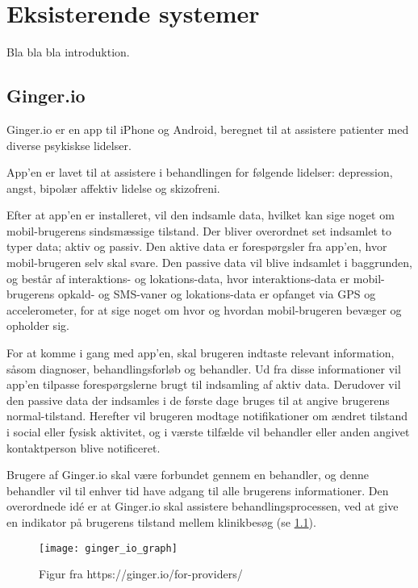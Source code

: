 \chapter{Eksisterende systemer}
Bla bla bla introduktion.

\section{Ginger.io}
Ginger.io er en app til iPhone og Android, beregnet til at assistere patienter med diverse psykiskse lidelser.\cite{ginger_dot_io}\cite{gingerio_mit}\cite{gingerio_dailymail}


App'en er lavet til at assistere i behandlingen for følgende lidelser: depression, angst, bipolær affektiv lidelse og skizofreni.

Efter at app'en er installeret, vil den indsamle data, hvilket kan sige noget om mobil-brugerens sindsmæssige tilstand.
Der bliver overordnet set indsamlet to typer data; aktiv og passiv.
Den aktive data er forespørgsler fra app'en, hvor mobil-brugeren selv skal svare.
Den passive data vil blive indsamlet i baggrunden, og består af interaktions- og lokations-data, hvor interaktions-data er mobil-brugerens opkald- og SMS-vaner og lokations-data er opfanget via GPS og accelerometer, for at sige noget om hvor og hvordan mobil-brugeren bevæger og opholder sig.

For at komme i gang med app'en, skal brugeren indtaste relevant information, såsom diagnoser, behandlingsforløb og behandler.
Ud fra disse informationer vil app'en tilpasse forespørgslerne brugt til indsamling af aktiv data.
Derudover vil den passive data der indsamles i de første dage bruges til at angive brugerens normal-tilstand.
Herefter vil brugeren modtage notifikationer om ændret tilstand i social eller fysisk aktivitet, og i værste tilfælde vil behandler eller anden angivet kontaktperson blive notificeret.

Brugere af Ginger.io skal være forbundet gennem en behandler, og denne behandler vil til enhver tid have adgang til alle brugerens informationer.
Den overordnede idé er at Ginger.io skal assistere behandlingsprocessen, ved at give en indikator på brugerens tilstand mellem klinikbesøg (se \cref{eksisterende_systemer:ginger_io_graf}).

\begin{figure}[h]
\centering
\texttt{[image: ginger\_io\_graph]}
\caption{Figur fra https://ginger.io/for-providers/}
\label{eksisterende_systemer:ginger_io_graf}
\end{figure}

